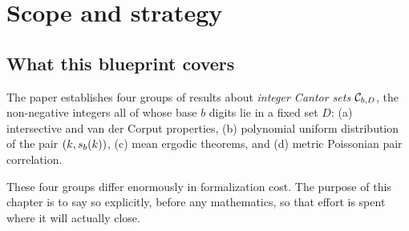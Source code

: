 %

\chapter{Scope and strategy}

\section{What this blueprint covers}

The paper establishes four groups of results about \emph{integer Cantor sets}
$\mathcal{C}_{b,D}$, the non-negative integers all of whose base $b$ digits lie in a fixed
set $D$: (a) intersective and van der Corput properties, (b) polynomial
uniform distribution of the pair $(k, s_b(k))$, (c) mean ergodic theorems, and
(d) metric Poissonian pair correlation.

These four groups differ enormously in formalization cost. The purpose of this
chapter is to say so explicitly, before any mathematics, so that effort is
spent where it will actually close.

